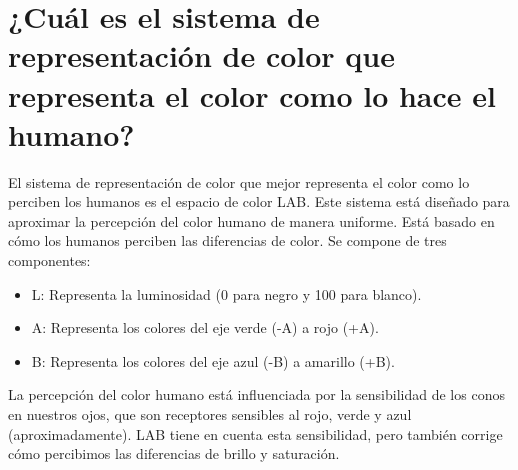 \documentclass[12pt,letterpaper]{article}
\begin{document}
\section{¿Cuál es el sistema de representación de color que representa el color como lo hace el humano?}
El sistema de representación de color que mejor representa el color como lo perciben los humanos es el espacio de color LAB. Este sistema está diseñado para aproximar la percepción del color humano de manera uniforme. 
Está basado en cómo los humanos perciben las diferencias de color. Se compone de tres componentes:
\begin{itemize}
\item L: Representa la luminosidad (0 para negro y 100 para blanco).
\item A: Representa los colores del eje verde (-A) a rojo (+A).
\item B: Representa los colores del eje azul (-B) a amarillo (+B).
\end{itemize}
La percepción del color humano está influenciada por la sensibilidad de los conos en nuestros ojos, que son receptores sensibles al rojo, verde y azul (aproximadamente). LAB tiene en cuenta esta sensibilidad, pero también corrige cómo percibimos las diferencias de brillo y saturación.
\end{document}
